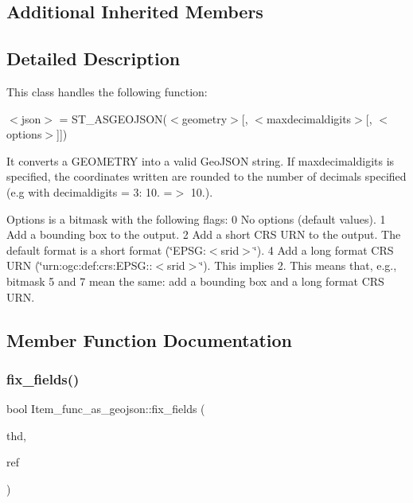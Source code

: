 \subsection*{Additional Inherited Members}


\subsection{Detailed Description}
This class handles the following function\+:

$<$json$>$ = S\+T\+\_\+\+A\+S\+G\+E\+O\+J\+S\+O\+N($<$geometry$>$\mbox{[}, $<$maxdecimaldigits$>$\mbox{[}, $<$options$>$\mbox{]}\mbox{]})

It converts a G\+E\+O\+M\+E\+T\+RY into a valid Geo\+J\+S\+ON string. If maxdecimaldigits is specified, the coordinates written are rounded to the number of decimals specified (e.\+g with decimaldigits = 3\+: 10. =$>$ 10.).

Options is a bitmask with the following flags\+: 0 No options (default values). 1 Add a bounding box to the output. 2 Add a short C\+RS U\+RN to the output. The default format is a short format (\char`\"{}\+E\+P\+S\+G\+:$<$srid$>$\char`\"{}). 4 Add a long format C\+RS U\+RN (\char`\"{}urn\+:ogc\+:def\+:crs\+:\+E\+P\+S\+G\+::$<$srid$>$\char`\"{}). This implies 2. This means that, e.\+g., bitmask 5 and 7 mean the same\+: add a bounding box and a long format C\+RS U\+RN. 

\subsection{Member Function Documentation}
\mbox{\label{classItem__func__as__geojson_ae3c03fcff07e6a227a22639d792e70f4}} 
\subsubsection{\texorpdfstring{fix\+\_\+fields()}{fix\_fields()}}
{\footnotesize\ttfamily bool Item\+\_\+func\+\_\+as\+\_\+geojson\+::fix\+\_\+fields (\begin{DoxyParamCaption}\item[{T\+HD $\ast$}]{thd,  }\item[{\mbox{\hyperlink{classItem}{Item}} $\ast$$\ast$}]{ref }\end{DoxyParamCaption})\hspace{0.3cm}{\ttfamily [virtual]}}

